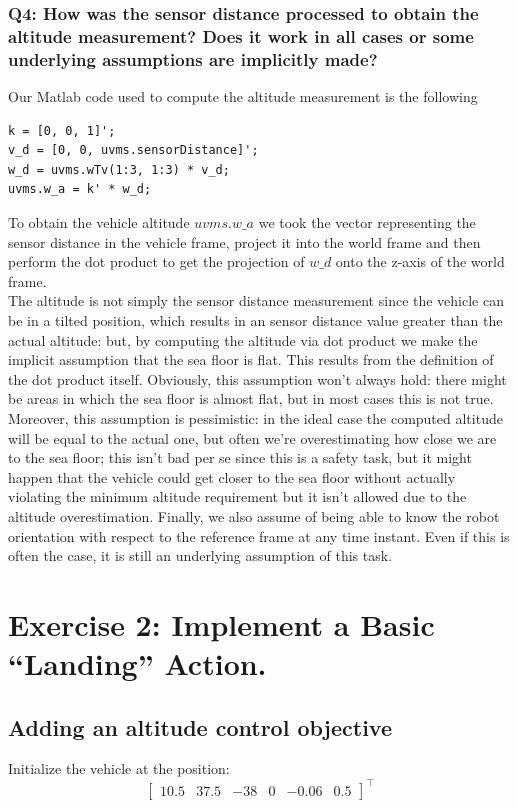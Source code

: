 \documentclass{article}
\begin{document}
\subsubsection{Q4: How was the sensor distance processed to obtain the altitude measurement? Does it work in all cases or some underlying assumptions are implicitly made?}
Our Matlab code used to compute the altitude measurement is the following
\begin{lstlisting}
k = [0, 0, 1]';
v_d = [0, 0, uvms.sensorDistance]';
w_d = uvms.wTv(1:3, 1:3) * v_d;
uvms.w_a = k' * w_d;
\end{lstlisting}
To obtain the vehicle altitude $ uvms.w\_a $ we took the vector representing the sensor distance in the vehicle frame, project it into the world frame and then perform the dot product to get the projection of $ w\_d $ onto the z-axis of the world frame. \\
The altitude is not simply the sensor distance measurement since the vehicle can be in a tilted position, which results in an sensor distance value greater than the actual altitude: but, by computing the altitude via dot product we make the implicit assumption that the sea floor is flat. This results from the definition of the dot product itself. Obviously, this assumption won't always hold: there might be areas in which the sea floor is almost flat, but in most cases this is not true. \\
Moreover, this assumption is pessimistic: in the ideal case the computed altitude will be equal to the actual one, but often we're overestimating how close we are to the sea floor; this isn't bad per se since this is a safety task, but it might happen that the vehicle could get closer to the sea floor without actually violating the minimum altitude requirement but it isn't allowed due to the altitude overestimation.
Finally, we also assume of being able to know the robot orientation with respect to the reference frame at any time instant. Even if this is often the case, it is still an underlying assumption of this task. 

\clearpage



\section{Exercise 2: Implement a Basic “Landing” Action.}
\subsection{Adding an altitude control objective}
Initialize the vehicle at the position:
\begin{displaymath}
\begin{bmatrix} 10.5 & 37.5 & -38 & 0 & -0.06 & 0.5 \end{bmatrix}^\top
\end{displaymath}
\end{document}
